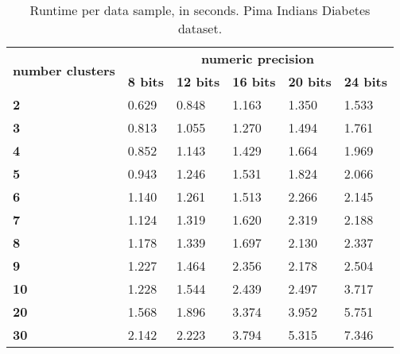 \begin{table}[H]
\centering
\caption{Runtime per data sample, in seconds. Pima Indians Diabetes dataset.}
\label{table:runtimeKMPID}
\begin{tabular}{|l|l|l|l|l|l|}
\hline
\multirow{2}{*}{\textbf{number clusters}} & \multicolumn{5}{c}{\textbf{numeric precision}}                                              \\ \cline{2-6}
                                          & \textbf{8 bits} & \textbf{12 bits} & \textbf{16 bits} & \textbf{20 bits} & \textbf{24 bits} \\ \hline
\textbf{2}                                & 0.629           & 0.848            & 1.163            & 1.350            & 1.533            \\ \hline
\textbf{3}                                & 0.813           & 1.055            & 1.270            & 1.494            & 1.761            \\ \hline
\textbf{4}                                & 0.852           & 1.143            & 1.429            & 1.664            & 1.969            \\ \hline
\textbf{5}                                & 0.943           & 1.246            & 1.531            & 1.824            & 2.066            \\ \hline
\textbf{6}                                & 1.140           & 1.261            & 1.513            & 2.266            & 2.145            \\ \hline
\textbf{7}                                & 1.124           & 1.319            & 1.620            & 2.319            & 2.188            \\ \hline
\textbf{8}                                & 1.178           & 1.339            & 1.697            & 2.130            & 2.337            \\ \hline
\textbf{9}                                & 1.227           & 1.464            & 2.356            & 2.178            & 2.504            \\ \hline
\textbf{10}                               & 1.228           & 1.544            & 2.439            & 2.497            & 3.717            \\ \hline
\textbf{20}                               & 1.568           & 1.896            & 3.374            & 3.952            & 5.751            \\ \hline
\textbf{30}                               & 2.142           & 2.223            & 3.794            & 5.315            & 7.346            \\ \hline

\end{tabular}
\end{table}
